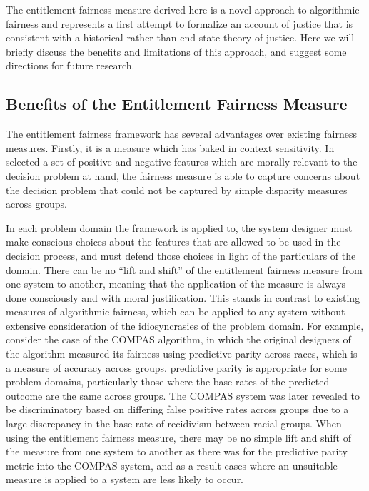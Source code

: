 The entitlement fairness measure derived here is a novel approach to algorithmic
fairness and represents a first attempt to formalize an account of justice that
is consistent with a historical rather than end-state theory of justice. Here we
will briefly discuss the benefits and limitations of this approach, and suggest
some directions for future research.

\subsection{Benefits of the Entitlement Fairness Measure}

The entitlement fairness framework has several advantages over existing fairness
measures. Firstly, it is a measure which has baked in context sensitivity. In
selected a set of positive and negative features which are morally relevant to
the decision problem at hand, the fairness measure is able to capture
concerns about the decision problem that could not be captured by simple 
disparity measures across groups. 

In each problem domain the framework is applied to, the system designer must
make conscious choices about the features that are allowed to be used in the 
decision process, and must defend those choices in light of the particulars of
the domain. There can be no ``lift and shift'' of the entitlement fairness 
measure from one system to another, meaning that the application of the measure
is always done consciously and with moral justification. This stands in contrast
to existing measures of algorithmic fairness, which can be applied to any system
without extensive consideration of the idiosyncrasies of the problem domain. For
example, consider the case of the COMPAS algorithm, in which the original
designers of the algorithm measured its fairness using predictive parity across
races, which is a measure of accuracy across groups. predictive parity is
appropriate for some problem domains, particularly those where the base rates of
the predicted outcome are the same across groups. The COMPAS system was later
revealed to be discriminatory based on differing false positive rates across 
groups due to a large discrepancy in the base rate of recidivism between racial
groups. When using the entitlement fairness measure, there may be no simple lift
and shift of the measure from one system to another as there was for the
predictive parity metric into the COMPAS system, and as a result cases where an
unsuitable measure is applied to a system are less likely to occur.

